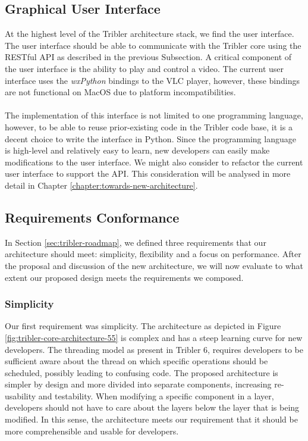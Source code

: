 \subsection{Graphical User Interface}
At the highest level of the Tribler architecture stack, we find the user interface. The user interface should be able to communicate with the Tribler core using the RESTful API as described in the previous Subsection. A critical component of the user interface is the ability to play and control a video. The current user interface uses the \emph{wxPython} bindings to the VLC player, however, these bindings are not functional on MacOS due to platform incompatibilities.\\\\
The implementation of this interface is not limited to one programming language, however, to be able to reuse prior-existing code in the Tribler code base, it is a decent choice to write the interface in Python. Since the programming language is high-level and relatively easy to learn, new developers can easily make modifications to the user interface. We might also consider to refactor the current user interface to support the API. This consideration will be analysed in more detail in Chapter \ref{chapter:towards-new-architecture}. 

\subsection{Requirements Conformance}
In Section \ref{sec:tribler-roadmap}, we defined three requirements that our architecture should meet: simplicity, flexibility and a focus on performance. After the proposal and discussion of the new architecture, we will now evaluate to what extent our proposed design meets the requirements we composed.

\subsubsection{\textbf{Simplicity}}
Our first requirement was simplicity. The architecture as depicted in Figure \ref{fig:tribler-core-architecture-55} is complex and has a steep learning curve for new developers. The threading model as present in Tribler 6, requires developers to be sufficient aware about the thread on which specific operations should be scheduled, possibly leading to confusing code. The proposed architecture is simpler by design and more divided into separate components, increasing re-usability and testability. When modifying a specific component in a layer, developers should not have to care about the layers below the layer that is being modified. In this sense, the architecture meets our requirement that it should be more comprehensible and usable for developers.

